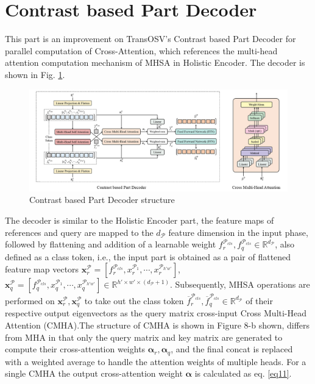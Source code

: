 \section{Contrast based Part Decoder}

This part is an improvement on TransOSV's Contrast based Part Decoder \cite{41} for parallel computation of Cross-Attention, which references the multi-head attention computation mechanism of MHSA in Holistic Encoder. The decoder is shown in Fig. \ref{fig:decoder}.

\begin{figure}[H]
  \centering
      \includegraphics[scale=0.44]{figure/decoder.png}
  \caption{Contrast based Part Decoder structure}
  \label{fig:decoder}
\end{figure}

The decoder is similar to the Holistic Encoder part, the feature maps of references and query are mapped to the $d_\mathcal{P}$ feature dimension in the input phase, followed by flattening and addition of a learnable weight $f_r^{\mathcal{P}_{cls}},f_q^{\mathcal{P}_{cls}} \in \mathbb{R}^{d_\mathcal{P}}$, also defined as a class token, i.e., the input part is obtained as a pair of flattened feature map vectors $\boldsymbol{x}_r^\mathcal{P} = [f_r^{\mathcal{P}_{cls}}, x_r^{\mathcal{P}_1},\cdots ,x_r^{\mathcal{P}_{h' w' }} ]$, $\boldsymbol{x}_q^\mathcal{P}=[f_q^{\mathcal{P}_{cls}},x_q^{\mathcal{P}_1},\cdots,x_q^{\mathcal{P}_{h'w'} } ] \in \mathbb{R}^{h' \times w' \times (d_\mathcal{P}+1)}$. Subsequently, MHSA operations are performed on $\boldsymbol{x}_r^\mathcal{P},\boldsymbol{x}_q^\mathcal{P}$ to take out the class token $\overline{f}_r^{\mathcal{P}_{cls}},\overline{f}_q^{\mathcal{P}_{cls}} \in \mathbb{R}^{d_\mathcal{P}}$ of their respective output eigenvectors as the query matrix cross-input Cross Multi-Head Attention (CMHA).The structure of CMHA is shown in Figure 8-b shown, differs from MHA in that only the query matrix and key matrix are generated to compute their cross-attention weights $\boldsymbol{\alpha}_r,\boldsymbol{\alpha}_q$, and the final concat is replaced with a weighted average to handle the attention weights of multiple heads. For a single CMHA the output cross-attention weight $\boldsymbol{\alpha}$ is calculated as eq. \ref{eq11}.

